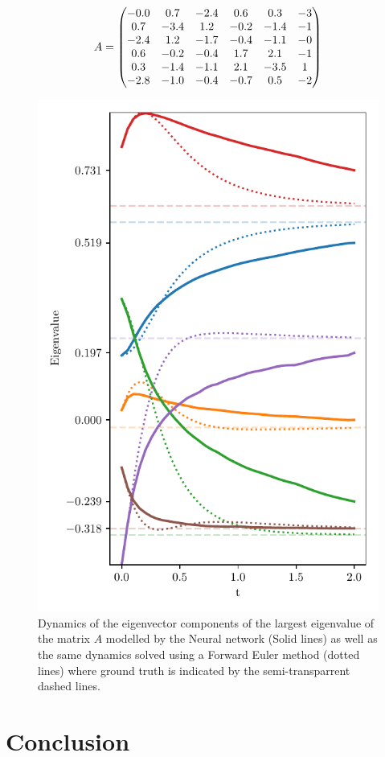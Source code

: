 \documentclass[reprint, english, nofootinbib]{revtex4-2}
\begin{document}
\begin{equation}
    A = \qty(
    \begin{matrix}
     -0.0 & 0.7 & -2.4 & 0.6 & 0.3 & -3 \\
     0.7 & -3.4 & 1.2 & -0.2 & -1.4 & -1 \\
     -2.4 & 1.2 & -1.7 & -0.4 & -1.1 & -0 \\
     0.6 & -0.2 & -0.4 & 1.7 & 2.1 & -1 \\
     0.3 & -1.4 & -1.1 & 2.1 & -3.5 & 1 \\
     -2.8 & -1.0 & -0.4 & -0.7 & 0.5 & -2 \\
    \end{matrix}
    )
\end{equation}
\begin{figure}[h!tb]
   \center
   \includegraphics[width=.8\columnwidth]{eigenvec_dynamics.pdf} 
   \caption{\label{fig:eigenvector} Dynamics of the eigenvector components of the largest eigenvalue of the matrix $A$ modelled by the Neural network (Solid lines) as well as the same dynamics solved using a Forward Euler method (dotted lines) where ground truth is indicated by the semi-transparrent dashed lines.}
\end{figure}
\section{Conclusion}

\onecolumngrid

\twocolumngrid
\end{document}
